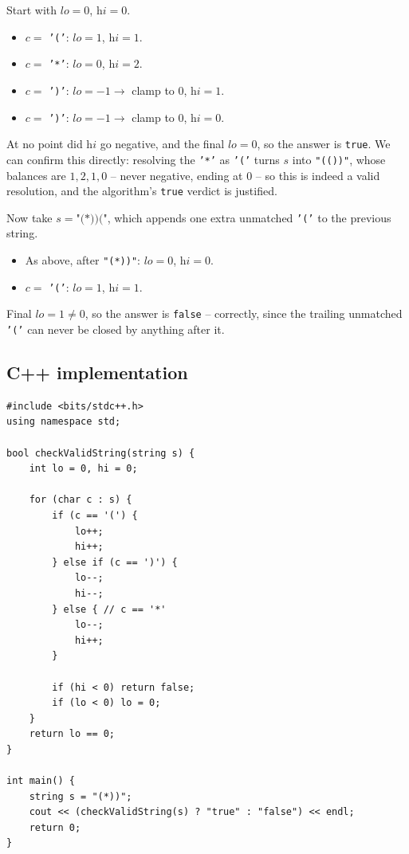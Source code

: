 
Start with $\textit{lo}=0$, $\textit{hi}=0$.

\begin{itemize}
  \item $c = $ \texttt{'('}: $\textit{lo}=1$, $\textit{hi}=1$.
  \item $c = $ \texttt{'*'}: $\textit{lo}=0$, $\textit{hi}=2$.
  \item $c = $ \texttt{')'}: $\textit{lo}=-1 \to$ clamp to $0$,
        $\textit{hi}=1$.
  \item $c = $ \texttt{')'}: $\textit{lo}=-1 \to$ clamp to $0$,
        $\textit{hi}=0$.
\end{itemize}

At no point did $\textit{hi}$ go negative, and the final $\textit{lo} = 0$,
so the answer is \texttt{true}. We can confirm this directly: resolving the
\texttt{'*'} as \texttt{'('} turns $s$ into \texttt{"(())"}, whose balances
are $1,2,1,0$ -- never negative, ending at $0$ -- so this is indeed a valid
resolution, and the algorithm's \texttt{true} verdict is justified.

Now take $s = \texttt{"(*))("}$, which appends one extra unmatched
\texttt{'('} to the previous string.

\begin{itemize}
  \item As above, after \texttt{"(*))"}: $\textit{lo}=0$, $\textit{hi}=0$.
  \item $c = $ \texttt{'('}: $\textit{lo}=1$, $\textit{hi}=1$.
\end{itemize}

Final $\textit{lo} = 1 \neq 0$, so the answer is \texttt{false} -- correctly,
since the trailing unmatched \texttt{'('} can never be closed by anything
after it.

\subsection*{C++ implementation}

\begin{lstlisting}
#include <bits/stdc++.h>
using namespace std;

bool checkValidString(string s) {
    int lo = 0, hi = 0;

    for (char c : s) {
        if (c == '(') {
            lo++;
            hi++;
        } else if (c == ')') {
            lo--;
            hi--;
        } else { // c == '*'
            lo--;
            hi++;
        }

        if (hi < 0) return false;
        if (lo < 0) lo = 0;
    }
    return lo == 0;
}

int main() {
    string s = "(*))";
    cout << (checkValidString(s) ? "true" : "false") << endl;
    return 0;
}
\end{lstlisting}

